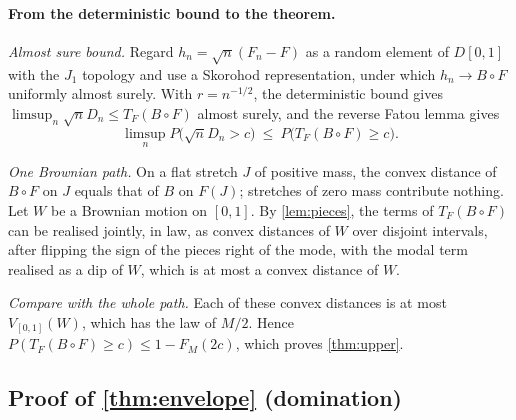 \paragraph{From the deterministic bound to the theorem.}
\begin{steps}
\item \emph{Almost sure bound.} Regard $h_n=\sqrt n(F_n-F)$ as a random element of $D[0,1]$ with the $J_1$ topology and use a Skorohod representation, under which $h_n\to B\circ F$ uniformly almost surely. With $r=n^{-1/2}$, the deterministic bound gives $\limsup_n\sqrt nD_n\le T_F(B\circ F)$ almost surely, and the reverse Fatou lemma gives
\[
\limsup_nP\bigl(\sqrt nD_n>c\bigr)\ \le\ P\bigl(T_F(B\circ F)\ge c\bigr).
\]
\item \emph{One Brownian path.} On a flat stretch $J$ of positive mass, the convex distance of $B\circ F$ on $J$ equals that of $B$ on $F(J)$; stretches of zero mass contribute nothing. Let $W$ be a Brownian motion on $[0,1]$. By \cref{lem:pieces}, the terms of $T_F(B\circ F)$ can be realised jointly, in law, as convex distances of $W$ over disjoint intervals, after flipping the sign of the pieces right of the mode, with the modal term realised as a dip of $W$, which is at most a convex distance of $W$.
\item \emph{Compare with the whole path.} Each of these convex distances is at most $V_{[0,1]}(W)$, which has the law of $M/2$. Hence $P(T_F(B\circ F)\ge c)\le1-F_M(2c)$, which proves \cref{thm:upper}.
\end{steps}

\subsection{Proof of \cref{thm:envelope} (domination)}


